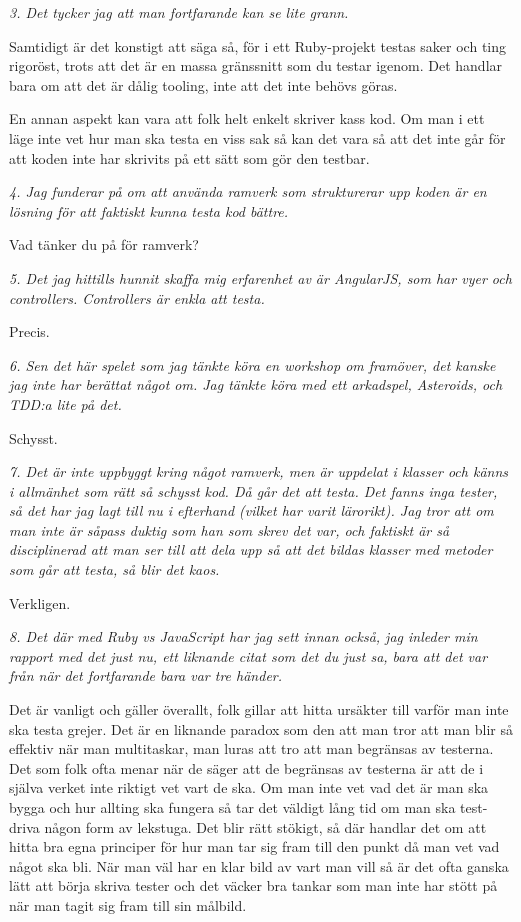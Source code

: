 \documentclass[11pt]{article}
\begin{document}
\emph{3. Det tycker jag att man fortfarande kan se lite grann.}

Samtidigt är det konstigt att säga så, för i ett Ruby-projekt testas saker och ting rigoröst, trots att det är en massa gränssnitt som du testar igenom. Det handlar bara om att det är dålig tooling, inte att det inte behövs göras.

En annan aspekt kan vara att folk helt enkelt skriver kass kod. Om man i ett läge inte vet hur man ska testa en viss sak så kan det vara så att det inte går för att koden inte har skrivits på ett sätt som gör den testbar.

\emph{4. Jag funderar på om att använda ramverk som strukturerar upp koden är en lösning för att faktiskt kunna testa kod bättre.}

Vad tänker du på för ramverk?

\emph{5. Det jag hittills hunnit skaffa mig erfarenhet av är AngularJS, som har vyer och controllers. Controllers är enkla att testa.}

Precis.

\emph{6. Sen det här spelet som jag tänkte köra en workshop om framöver, det kanske jag inte har berättat något om. Jag tänkte köra med ett arkadspel, Asteroids, och TDD:a lite på det.}

Schysst.

\emph{7. Det är inte uppbyggt kring något ramverk, men är uppdelat i klasser och känns i allmänhet som rätt så schysst kod. Då går det att testa. Det fanns inga tester, så det har jag lagt till nu i efterhand (vilket har varit lärorikt). Jag tror att om man inte är såpass duktig som han som skrev det var, och faktiskt är så disciplinerad att man ser till att dela upp så att det bildas klasser med metoder som går att testa, så blir det kaos.}

Verkligen.

\emph{8. Det där med Ruby vs JavaScript har jag sett innan också, jag inleder min rapport med det just nu, ett liknande citat som det du just sa, bara att det var från när det fortfarande bara var tre händer.}

Det är vanligt och gäller överallt, folk gillar att hitta ursäkter till varför man inte ska testa grejer. Det är en liknande paradox som den att man tror att man blir så effektiv när man multitaskar, man luras att tro att man begränsas av testerna. Det som folk ofta menar när de säger att de begränsas av testerna är att de i själva verket inte riktigt vet vart de ska. Om man inte vet vad det är man ska bygga och hur allting ska fungera så tar det väldigt lång tid om man ska test-driva någon form av lekstuga. Det blir rätt stökigt, så där handlar det om att hitta bra egna principer för hur man tar sig fram till den punkt då man vet vad något ska bli. När man väl har en klar bild av vart man vill så är det ofta ganska lätt att börja skriva tester och det väcker bra tankar som man inte har stött på när man tagit sig fram till sin målbild.
\end{document}
